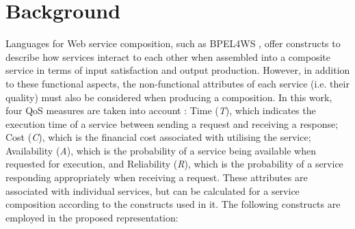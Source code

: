 \documentclass[conference]{IEEEtran}
\begin{document}
\section{Background}\label{background}\label{constructs}

Languages for Web service composition, such as BPEL4WS \cite{wohed2003analysis}, offer constructs to describe how services interact to each other when assembled into a composite 
service in terms of input satisfaction and output production. However, in addition to these functional aspects, the non-functional attributes of each service (i.e. 
their quality) must also be considered when producing a composition. In this work, four QoS measures are taken into account \cite{jaeger2007qos,yu2013adaptive}: Time (\textit{T}), which indicates 
the 
execution time of a service between sending a request and receiving a response; Cost (\textit{C}), which is the financial cost associated with utilising the 
service; Availability (\textit{A}), which is the probability of a service being available when requested for execution, and Reliability (\textit{R}), which is 
the probability of a service responding appropriately when receiving a request. These attributes are associated with individual services, but can be calculated 
for a service composition according to the constructs used in it. The following constructs are employed in the proposed representation: 
\end{document}
